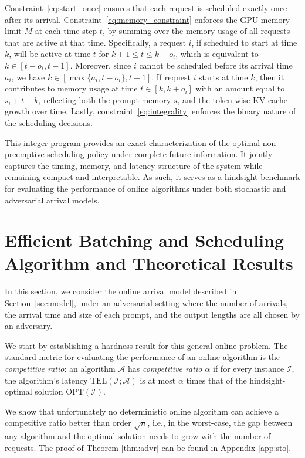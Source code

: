\documentclass[11pt, a4paper]{article}
\theoremstyle{plain}
\theoremstyle{definition}
\theoremstyle{remark}
\begin{document}
Constraint~\eqref{eq:start_once} ensures that each request is scheduled exactly once after its arrival. Constraint~\eqref{eq:memory_constraint} enforces the GPU memory limit \( M \) at each time step \( t \), by summing over the memory usage of all requests that are active at that time. Specifically, a request \( i \), if scheduled to start at time \( k \), will be active at time \( t \) for \( k+1 \leq t \leq k + o_i \), which is equivalent to \( k \in [t - o_i, t-1] \). Moreover, since \( i \) cannot be scheduled before its arrival time \( a_i \),  we have \( k \in [\max\{a_i, t - o_i\}, t-1]. \)
If request \( i \) starts at time \( k \), then it contributes to memory usage at time \( t \in [k, k + o_i] \) with an amount equal to \( s_i + t - k \), reflecting both the prompt memory \( s_i \) and the token-wise KV cache growth over time. Lastly, constraint~\eqref{eq:integrality} enforces the binary nature of the scheduling decisions.

This integer program provides an exact characterization of the optimal non-preemptive scheduling policy under complete future information. It jointly captures the timing, memory, and latency structure of the system while remaining compact and interpretable. As such, it serves as a hindsight benchmark for evaluating the performance of online algorithms under both stochastic and adversarial arrival models.


\section{Efficient Batching and Scheduling Algorithm and Theoretical Results} \label{sec:stochastic}

In this section, we consider the online arrival model described in Section~\ref{sec:model}, under an adversarial setting where the number of arrivals, the arrival time and size of each prompt, and the output lengths are all chosen by an adversary. 

We start by establishing a hardness result for this general online problem. The standard metric for evaluating the performance of an online algorithm is the \emph{competitive ratio}: an algorithm $\mathcal{A}$ has \emph{competitive ratio $\alpha$} if for every instance $\mathcal{I}$, the algorithm's latency $\text{TEL}(\mathcal{I}; \mathcal{A})$ is at most $\alpha$ times that of the  hindsight-optimal solution $\text{OPT}(\mathcal{I})$.

We show that unfortunately no deterministic online algorithm can achieve a competitive ratio better than order $\sqrt{n}$, i.e., in the worst-case, the gap between any algorithm and the optimal solution needs to grow with the number of requests. The proof of Theorem \ref{thm:advr} can be found in Appendix \ref{app:sto}.
\end{document}
